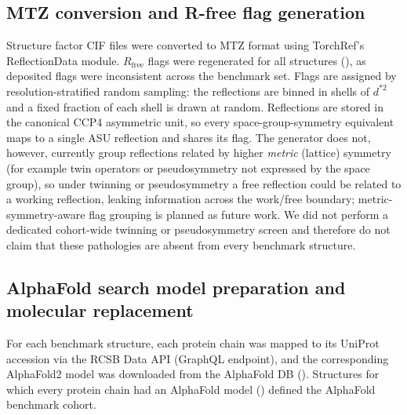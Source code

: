 \documentclass{iucrjournals}
\begin{document}
\subsection{MTZ conversion and R-free flag generation}

Structure factor CIF files were converted to MTZ format using TorchRef's
ReflectionData module.
$R_\mathrm{free}$ flags were regenerated for all structures
(), as deposited flags were
inconsistent across the benchmark set.
Flags are assigned by resolution-stratified random sampling: the reflections
are binned in shells of $d^{*2}$ and a fixed fraction of each shell is drawn at
random. Reflections are stored in the canonical CCP4 asymmetric unit, so every
space-group-symmetry equivalent maps to a single ASU reflection and shares its
flag. The generator does not, however, currently group reflections related by
higher \emph{metric} (lattice) symmetry (for example twin operators or
pseudosymmetry not expressed by the space group), so under twinning or
pseudosymmetry a free reflection could be related to a working reflection,
leaking information across the work/free boundary; metric-symmetry-aware flag
grouping is planned as future work. We did not perform a dedicated cohort-wide
twinning or pseudosymmetry screen and therefore do not claim that these
pathologies are absent from every benchmark structure.

\subsection{AlphaFold search model preparation and molecular replacement}

For each benchmark structure, each protein chain was mapped to its UniProt
accession via the RCSB Data API (GraphQL endpoint), and the corresponding
AlphaFold2 model was downloaded from the AlphaFold DB
().
Structures for which every protein chain had an AlphaFold model
() defined the AlphaFold benchmark cohort.
\end{document}
